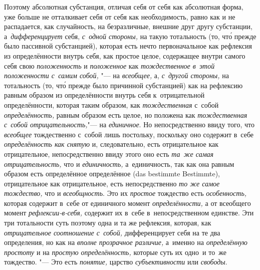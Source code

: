 Поэтому абсолютная субстанция, отличая себя от себя как абсолютная форма, уже
больше не отталкивает себя от себя как необходимость, равно как и не
распадается, как случайность, на безразличные, внешние друг другу субстанции,
а~{\em дифференцирует} себя, {\em с~одной стороны,} на такую тотальность
(то, чт\'{о} прежде было пассивной субстанцией), которая есть нечто
первоначальное как рефлексия из определённости внутрь себя, как простое целое,
содержащее внутри самого себя свою {\em положенность} и {\em положенное} как
{\em тождественное в~этой положенности с~самим собой,} "--- на {\em всеобщее,}
а, {\em с~другой стороны,} на тотальность (то, чт\'{о} прежде было причинной
субстанцией) как на рефлексию равным образом из определённости внутрь себя
к~отрицательной определённости, которая таким образом, как {\em тождественная}
с~собой {\em определённость,} равным образом есть целое, но положена как
{\em тождественная с~собой отрицательность,}"--- на {\em единичное}. Но
непосредственно ввиду того, что {\em всеобщее} тождественно с~собой лишь
постольку, поскольку оно содержит в~себе {\em определённость как снятую} и,
следовательно, есть отрицательное как отрицательное, непосредственно ввиду
этого оно есть {\em та~же самая отрицательность,} что и {\em единичность,}
а~единичность, так как она равным образом есть определённое определённое
(das bestimmte Bestimmte), отрицательное как отрицательное, есть
непосредственно {\em то же самое тождество,} что и {\em всеобщность}. Это их
{\em простое} тождество есть {\em особенность,} которая содержит в~себе от
единичного момент {\em определённости,} а от всеобщего момент
{\em рефлексии-в-себя,} содержит их в~себе в~непосредственном единстве.
Эти три тотальности суть поэтому одна и та же рефлексия, которая, как
{\em отрицательное соотношение с~собой,} дифференцирует себя на те два
определения, но как на {\em вполне прозрачное различие,} а~именно на
{\em определённую простоту} и на {\em простую определённость,} которые
суть их одно~и то~же тождество. "--- Это есть {\em понятие,} царство
{\em субъективности} или {\em свободы}.

\bigskip
